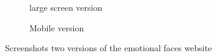 
\begin{figure}[t]
\centering
\begin{subfigure}{.6\textwidth}
  \centering
  \caption{large screen version}
  \label{fig:webisteversion}
\end{subfigure}%
\begin{subfigure}{.525\textwidth}
  \centering
  \caption{Mobile version}
  \label{fig:phoneversion}
\end{subfigure}
\caption{Screenshots two versions of the emotional faces website}
\label{fig:Site_versions}
\end{figure}


%
%
%

